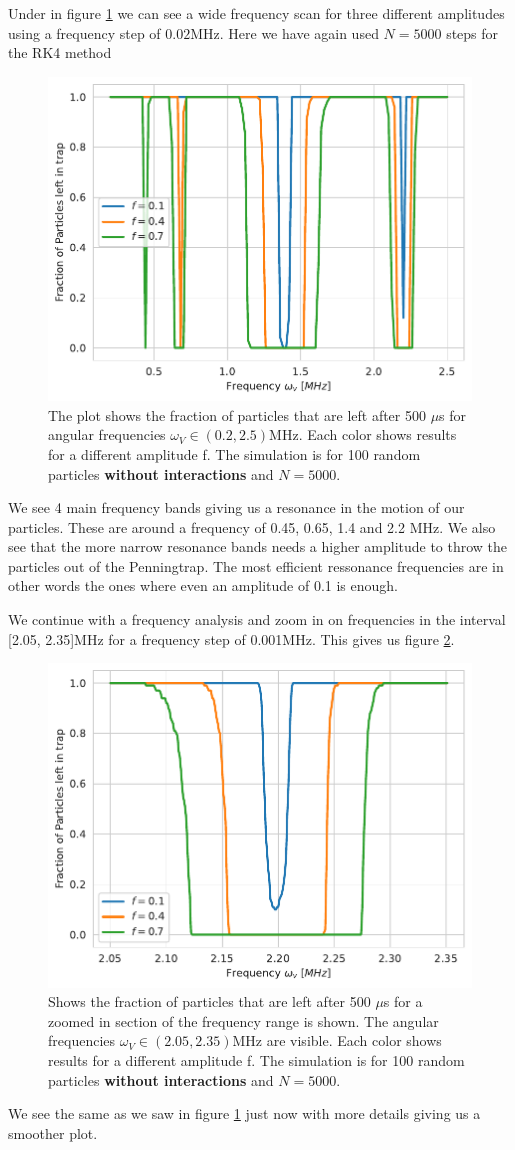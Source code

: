 \documentclass[english,notitlepage,reprint,nofootinbib]{revtex4-1}  %
\begin{document}
Under in figure \ref{fig:wide_freq_p_left_N_5000} we can see a wide frequency scan for three different amplitudes using a frequency step of $0.02$MHz.
Here we have again used $N=5000$ steps for the RK4 method
\begin{figure}[H]
    \centering
    \includegraphics[width=.5\textwidth]{../figures/wide_freq_p_left_N_5000.pdf}
    \caption{The plot shows the fraction of particles that are left after 500 $\mu$s for angular frequencies $\omega_V \in (0.2,2.5)$MHz. Each color
            shows results for a different amplitude f. The simulation is for 100 random particles \textbf{without interactions}
            and $N = 5000$.}
    \label{fig:wide_freq_p_left_N_5000}
\end{figure}
We see 4 main frequency bands giving us a resonance in the motion of our particles. These are around a frequency of 0.45, 0.65, 1.4 and 2.2 MHz. We also see that the more narrow resonance bands needs a higher amplitude to throw the particles out of the Penningtrap. The most efficient ressonance frequencies are in other words the ones where even an amplitude of 0.1 is enough.

We continue with a frequency analysis and zoom in on frequencies in the interval [2.05, 2.35]MHz for a frequency step of 0.001MHz. This gives us figure \ref{fig:narrow_freq_p_left_N_5000_zoom}.
\begin{figure}[H]
    \centering
    \includegraphics[width=.5\textwidth]{../figures/narrow_freq_p_left_N_5000_zoom.pdf}
    \caption{Shows the fraction of particles that are left after 500 $\mu$s for a zoomed in section of the frequency range
            is shown. The angular frequencies $\omega_V \in (2.05,2.35)$MHz are visible. Each color shows results for a
            different amplitude f. The simulation is for 100 random particles \textbf{without interactions} and $N = 5000$.}
    \label{fig:narrow_freq_p_left_N_5000_zoom}
\end{figure}
We see the same as we saw in figure \ref{fig:wide_freq_p_left_N_5000} just now with more details giving us a smoother plot.
\end{document}
